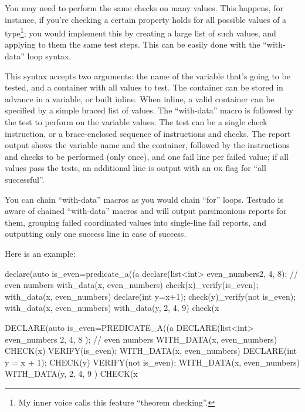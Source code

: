 \documentclass[twoside, a4paper, article]{memoir}
\begin{document}
You may need to perform the same checks on many values.  This happens, for
instance, if you're checking a certain property holds for all possible values
of a type\footnote{My inner voice calls this feature ``theorem checking''.};
you would implement this by creating a large list of such values, and applying
to them the same test steps.  This can be easily done with the ``with-data''
loop syntax.

This syntax accepts two arguments: the name of the variable that's going to be
tested, and a container with all values to test.  The container can be stored
in advance in a variable, or built inline.  When inline, a valid container can
be specified by a simple braced list of values.  The ``with-data'' macro is
followed by the test to perform on the variable values.  The test can be a
single check instruction, or a brace-enclosed sequence of instructions and
checks.  The report output shows the variable name and the container, followed
by the instructions and checks to be performed (only once), and one fail line
per failed value; if all values pass the tests, an additional line is output
with an \textsc{ok} flag for ``all successful''.

You can chain ``with-data'' macros as you would chain ``for'' loops.  Testudo
is aware of chained ``with-data'' macros and will output parsimonious reports
for them, grouping failed coordinated values into single-line fail reports, and
outputting only one success line in case of success.

Here is an example:
\begin{cpplisting}
declare(auto is_even=predicate_a((a%
declare(list<int> even_numbers{2, 4, 8}); // even numbers
with_data(x, even_numbers)
  check(x)_verify(is_even);
with_data(x, even_numbers) {
  declare(int y=x+1);
  check(y)_verify(not is_even);
}
with_data(x, even_numbers)
  with_data(y, {2, 4, 9})
    check(x%
\end{cpplisting}

\begin{cpplisting}
DECLARE(auto is_even=PREDICATE_A((a %
DECLARE(list<int> even_numbers{ 2, 4, 8 }); // even numbers
WITH_DATA(x, even_numbers)
  CHECK(x) VERIFY(is_even);
WITH_DATA(x, even_numbers)
{
  DECLARE(int y = x + 1);
  CHECK(y) VERIFY(not is_even);
}
WITH_DATA(x, even_numbers)
  WITH_DATA(y, { 2, 4, 9 })
    CHECK(x %
\end{cpplisting}
\end{document}
